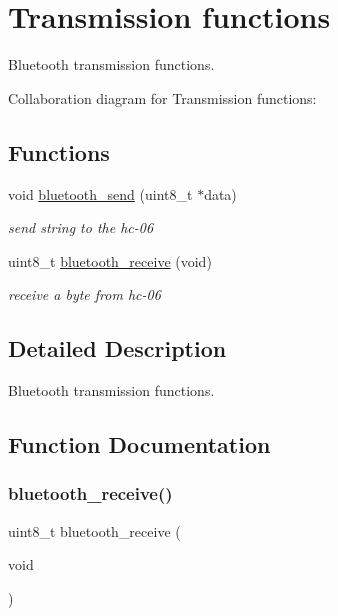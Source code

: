 \hypertarget{group___bluetooth___trans}{}\section{Transmission functions}
\label{group___bluetooth___trans}


Bluetooth transmission functions.  


Collaboration diagram for Transmission functions\+:
\subsection*{Functions}
\begin{DoxyCompactItemize}
\item 
void \hyperlink{group___bluetooth___trans_ga31d829d5658369ee2c90b9c3cdbedfe1}{bluetooth\+\_\+send} (uint8\+\_\+t $\ast$data)
\begin{DoxyCompactList}\small\item\em send string to the hc-\/06 \end{DoxyCompactList}\item 
uint8\+\_\+t \hyperlink{group___bluetooth___trans_gab7ad1e1b94cf1cedc8a8e5151b0e25cb}{bluetooth\+\_\+receive} (void)
\begin{DoxyCompactList}\small\item\em receive a byte from hc-\/06 \end{DoxyCompactList}\end{DoxyCompactItemize}


\subsection{Detailed Description}
Bluetooth transmission functions. 



\subsection{Function Documentation}
\mbox{\label{group___bluetooth___trans_gab7ad1e1b94cf1cedc8a8e5151b0e25cb}} 
\subsubsection{\texorpdfstring{bluetooth\+\_\+receive()}{bluetooth\_receive()}}
{\footnotesize\ttfamily uint8\+\_\+t bluetooth\+\_\+receive (\begin{DoxyParamCaption}\item[{void}]{ }\end{DoxyParamCaption})}



